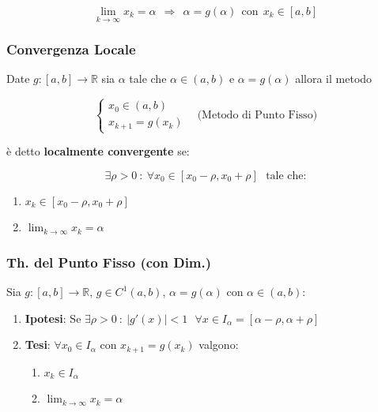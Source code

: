 \documentclass{article}
\begin{document}
\[ \lim_{k \rightarrow \infty} x_{k} = \alpha \:\: \Rightarrow \:\: \alpha = g(\alpha) \:\: \text{con} \:\: x_{k} \in [a,b] \]

\subsubsection{Convergenza Locale}

Date $g:[a,b] \rightarrow \mathbb{R}$ sia $\alpha$ tale che $\alpha \in (a,b)$ e $\alpha = g(\alpha)$ allora il metodo

\[ 
\left\{ \begin{array}{lll}
    x_{0} \in (a,b) \\
    x_{k+1} = g(x_{k})
    \end{array}\right.
    \:\:\:\: \text{(Metodo di Punto Fisso)} 
\]

è detto \textbf{localmente convergente} se:

\vspace*{-8px}

\[ \exists \rho > 0 \: : \: \forall x_{0} \in [x_{0}-\rho,x_{0}+\rho] \:\:\: \text{tale che:} \]

\begin{enumerate}
    \item $x_{k} \in [x_{0}-\rho,x_{0}+\rho]$
    \item $\lim_{k \rightarrow \infty} x_{k} = \alpha$
\end{enumerate}

\subsubsection{Th. del Punto Fisso (con Dim.)}

Sia $g:[a,b] \rightarrow \mathbb{R}$, $g \in C^{1}(a,b)$, $\alpha = g(\alpha)$ con $\alpha \in (a,b)$:

\begin{enumerate}
    \item \textbf{Ipotesi}: Se $\exists \rho > 0 \: : \: |g'(x)| < 1 \:\:\: \forall x \in I_{\alpha} = [\alpha-\rho,\alpha+\rho]$
    \item \textbf{Tesi}: $\forall x_{0} \in I_{\alpha}$ con $x_{k+1} = g(x_{k})$ valgono:
    \begin{enumerate}
        \item $x_{k} \in I_{\alpha}$
        \item $\lim_{k \rightarrow \infty} x_{k} = \alpha$
    \end{enumerate}
\end{enumerate}
\end{document}
